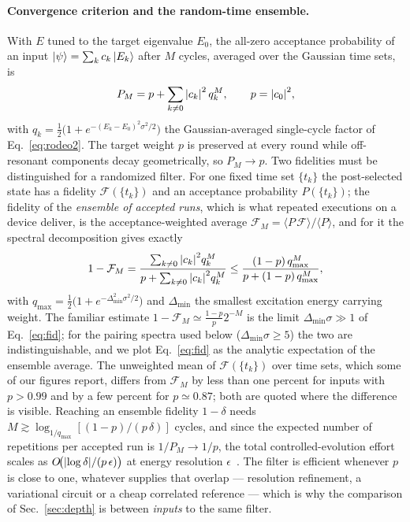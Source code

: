 \documentclass[
  aps,            %
  prc,            %
  reprint,        %
  superscriptaddress,
  floatfix,
  nofootinbib
]{revtex4-2}
\begin{document}
\paragraph{Convergence criterion and the random-time ensemble.}
With $E$ tuned to the target eigenvalue $E_0$, the all-zero acceptance probability of
an input $\ket{\psi}=\sum_k c_k\ket{E_k}$ after $M$ cycles, averaged over the
Gaussian time sets, is
\begin{equation}
  P_M=p+\sum_{k\neq0}\abs{c_k}^2\,q_k^{M},
  \qquad p=\abs{c_0}^2 ,
  \label{eq:PM}
\end{equation}
with $q_k=\tfrac12\big(1+e^{-(E_k-E_0)^2\sigma^2/2}\big)$ the Gaussian-averaged
single-cycle factor of Eq.~\eqref{eq:rodeo2}.
The target weight $p$ is preserved at every round while off-resonant components
decay geometrically, so $P_M\to p$.  Two fidelities must be distinguished for a
randomized filter.  For one fixed time set $\{t_k\}$ the post-selected state has
a fidelity $\mathcal F(\{t_k\})$ and an acceptance probability $P(\{t_k\})$; the
fidelity of the \emph{ensemble of accepted runs}, which is what repeated
executions on a device deliver, is the acceptance-weighted average
$\mathcal F_M=\langle P\,\mathcal F\rangle/\langle P\rangle$, and for it the
spectral decomposition gives exactly
\begin{equation}
  1-\mathcal{F}_M=\frac{\sum_{k\neq0}\abs{c_k}^2 q_k^{M}}
                       {p+\sum_{k\neq0}\abs{c_k}^2 q_k^{M}}
  \le\frac{(1-p)\,q_{\max}^{M}}{p+(1-p)\,q_{\max}^{M}},
  \label{eq:fid}
\end{equation}
with $q_{\max}=\tfrac12\big(1+e^{-\Delta_{\min}^2\sigma^2/2}\big)$ and
$\Delta_{\min}$ the smallest excitation energy carrying weight.  The
familiar estimate $1-\mathcal F_M\simeq\tfrac{1-p}{p}2^{-M}$ is the limit
$\Delta_{\min}\sigma\gg1$ of Eq.~\eqref{eq:fid}; for the pairing spectra used
below ($\Delta_{\min}\sigma\ge5$) the two are indistinguishable, and we plot
Eq.~\eqref{eq:fid} as the analytic expectation of the ensemble average.  The
unweighted mean of $\mathcal F(\{t_k\})$ over time sets, which some of our
figures report, differs from $\mathcal F_M$ by less than one percent for inputs
with $p>0.99$ and by a few percent for $p\simeq0.87$; both are quoted where the
difference is visible.  Reaching an ensemble fidelity $1-\delta$ needs
$M\gtrsim\log_{1/q_{\max}}[(1-p)/(p\,\delta)]$ cycles, and since the expected
number of repetitions per accepted run is $1/P_M\to1/p$, the total
controlled-evolution effort scales as $O\!\big(\abs{\log\delta}/(p\,\epsilon)\big)$
at energy resolution $\epsilon$~\cite{Choi2021}.  The filter is efficient
whenever $p$ is close to one, whatever supplies that overlap --- resolution
refinement, a variational circuit or a cheap correlated reference --- which is
why the comparison of Sec.~\ref{sec:depth} is between \emph{inputs} to the
same filter.
\end{document}
